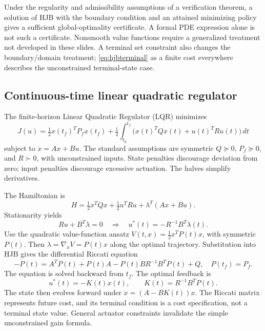 \documentclass[11pt,a4paper]{article}
\numberwithin{equation}{section}
\numberwithin{figure}{section}
\numberwithin{table}{section}
\begin{document}
Under the regularity and admissibility assumptions of a verification theorem, a solution of HJB with the boundary condition and an attained minimizing policy gives a sufficient global-optimality certificate. A formal PDE expression alone is not such a certificate. Nonsmooth value functions require a generalized treatment not developed in these slides. A terminal set constraint also changes the boundary/domain treatment; \cref{eq:hjbterminal} as a finite cost everywhere describes the unconstrained terminal-state case.

\subsection{Continuous-time linear quadratic regulator}
The finite-horizon Linear Quadratic Regulator (LQR) minimizes
\begin{equation}\label{eq:ctlqrcost}
J(u)=\tfrac12x(t_f)^TP_fx(t_f)+\tfrac12\int_{t_0}^{t_f}
\bigl(x(t)^TQx(t)+u(t)^TRu(t)\bigr)\,dt
\end{equation}
subject to $\dot x=Ax+Bu$. The standard assumptions are symmetric $Q\succeq0$, $P_f\succeq0$, and $R\succ0$, with unconstrained inputs. State penalties discourage deviation from zero; input penalties discourage excessive actuation. The halves simplify derivatives.

The Hamiltonian is
\[H=\tfrac12x^TQx+\tfrac12u^TRu+\lambda^T(Ax+Bu).\]
Stationarity yields
\begin{equation}Ru+B^T\lambda=0\quad\Longrightarrow\quad u^*(t)=-R^{-1}B^T\lambda(t).\end{equation}
Use the quadratic value-function ansatz $V(t,x)=\tfrac12x^TP(t)x$, with symmetric $P(t)$. Then $\lambda=\nabla_xV=P(t)x$ along the optimal trajectory. Substitution into HJB gives the differential Riccati equation
\begin{equation}\label{eq:ctriccati}
-\dot P(t)=A^TP(t)+P(t)A-P(t)BR^{-1}B^TP(t)+Q,\quad P(t_f)=P_f.
\end{equation}
The equation is solved backward from $t_f$. The optimal feedback is
\begin{equation}\label{eq:ctlqrgain}u^*(t)=-K(t)x(t),\qquad K(t)=R^{-1}B^TP(t).\end{equation}
The state then evolves forward under $\dot x=(A-BK(t))x$. The Riccati matrix represents future cost, and its terminal condition is a cost specification, not a terminal state value. General actuator constraints invalidate the simple unconstrained gain formula.
\end{document}
